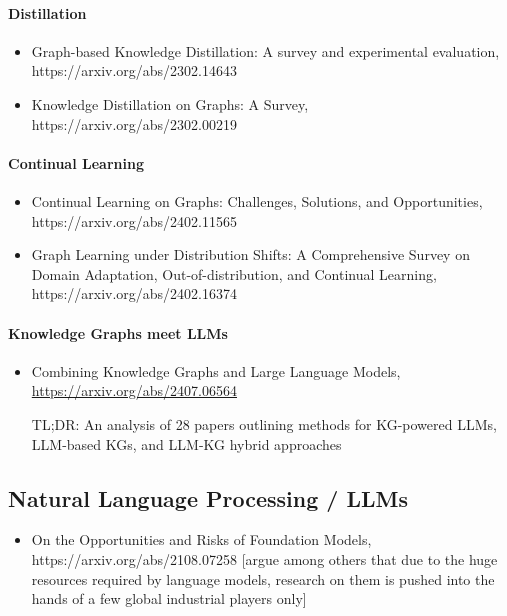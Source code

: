 \paragraph{Distillation}

\begin{itemize}
\item Graph-based Knowledge Distillation: A survey and experimental evaluation, https://arxiv.org/abs/2302.14643

\item Knowledge Distillation on Graphs: A Survey, https://arxiv.org/abs/2302.00219
\end{itemize}

\paragraph{Continual Learning}

\begin{itemize}
\item Continual Learning on Graphs: Challenges, Solutions, and Opportunities, https://arxiv.org/abs/2402.11565

\item Graph Learning under Distribution Shifts: A Comprehensive Survey on Domain Adaptation, Out-of-distribution, and Continual Learning, https://arxiv.org/abs/2402.16374
\end{itemize}

\paragraph{Knowledge Graphs meet LLMs}

\begin{itemize}
\item Combining Knowledge Graphs and Large Language Models, \url{https://arxiv.org/abs/2407.06564}

TL;DR: An analysis of 28 papers outlining methods for KG-powered LLMs, LLM-based KGs, and LLM-KG hybrid approaches
\end{itemize}


\subsection{Natural Language Processing / LLMs}

\begin{itemize}
\item On the Opportunities and Risks of Foundation Models, https://arxiv.org/abs/2108.07258 [argue among others that due to the huge resources required by language models, research on them is pushed into the hands of a few global industrial players only]
\end{itemize}

